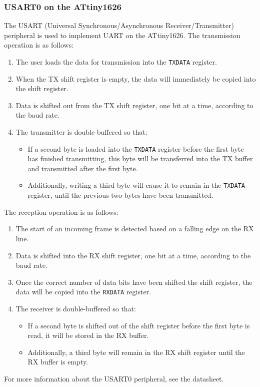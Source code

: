 \documentclass[a4paper]{report}
\begin{document}
\subsubsection{USART0 on the ATtiny1626}
The USART (Universal Synchronous/Asynchronous Receiver/Transmitter)
peripheral is used to implement UART on the ATtiny1626.
The transmission operation is as follows:
\begin{enumerate}
    \item The user loads the data for transmission into the \texttt{TXDATA} register.
    \item When the TX shift register is empty, the data will immediately be copied into the shift register.
    \item Data is shifted out from the TX shift register, one bit at a time, according to the baud rate.
    \item The transmitter is double-buffered so that:
          \begin{itemize}
              \item If a second byte is loaded into the \texttt{TXDATA} register before the first byte has finished transmitting,
                    this byte will be transferred into the TX buffer and transmitted after the first byte.
              \item Additionally, writing a third byte will cause it to remain in the \texttt{TXDATA} register, until the previous two bytes have been transmitted.
          \end{itemize}
\end{enumerate}
The reception operation is as follows:
\begin{enumerate}
    \item The start of an incoming frame is detected based on a falling edge on the RX line.
    \item Data is shifted into the RX shift register, one bit at a time, according to the baud rate.
    \item Once the correct number of data bits have been shifted the shift register, the data will be copied into the
          \texttt{RXDATA} register.
    \item The receiver is double-buffered so that:
          \begin{itemize}
              \item If a second byte is shifted out of the shift register before the first byte is read, it will be stored in the RX buffer.
              \item Additionally, a third byte will remain in the RX shift register until the RX buffer is empty.
          \end{itemize}
\end{enumerate}
For more information about the USART0 peripheral, see the datasheet.
\end{document}
